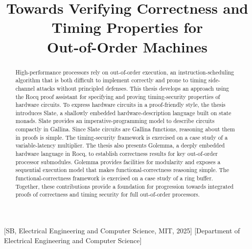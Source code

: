 \documentclass[fontset=fira-newtxsf]{mitthesis}
\theoremstyle{definition}
\theoremstyle{plain}
\begin{document}
\title{Towards Verifying Correctness and Timing Properties for \\ Out-of-Order Machines}
 [SB, Electrical Engineering and Computer Science, MIT, 2025]
[Department of Electrical Engineering and Computer Science]

\maketitle

\begin{abstract}
High-performance processors rely on out-of-order execution, an instruction-scheduling algorithm that is both difficult to implement correctly and prone to timing side-channel attacks without principled defenses.
This thesis develops an approach using the Rocq proof assistant for specifying and proving timing-security properties of hardware circuits.
To express hardware circuits in a proof-friendly style, the thesis introduces Slate, a shallowly embedded hardware-description language built on state monads.
Slate provides an imperative-programming model to describe circuits compactly in Gallina.
Since Slate circuits are Gallina functions, reasoning about them in proofs is simple.
The timing-security framework is exercised on a case study of a variable-latency multiplier.
The thesis also presents Golemma, a deeply embedded hardware language in Rocq, to establish correctness results for key out-of-order processor submodules.
Golemma provides facilities for modularity and exposes a sequential execution model that makes functional-correctness reasoning simple.
The functional-correctness framework is exercised on a case study of a ring buffer.
Together, these contributions provide a foundation for progression towards integrated proofs of correctness and timing security for full out-of-order processors.
\end{abstract}
\end{document}
